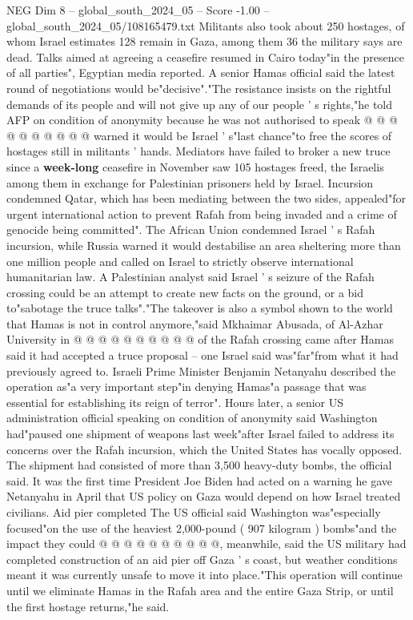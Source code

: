 \begin{textsample}{NEG Dim 8 – global\_south\_2024\_05 – Score -1.00 – global\_south\_2024\_05/108165479.txt}
Militants also took about 250 hostages, of whom Israel estimates 128 remain in Gaza, among them 36 the military says are dead.
Talks aimed at agreeing a ceasefire resumed in Cairo today"in the presence of all parties", Egyptian media reported.
A senior Hamas official said the latest round of negotiations would be"decisive"."The resistance insists on the rightful demands of its people and will not give up any of our people ' s rights,"he told AFP on condition of anonymity because he was not authorised to speak @ @ @ @ @ @ @ @ @ @ warned it would be Israel ' s"last chance"to free the scores of hostages still in militants ' hands.
Mediators have failed to broker a new truce since a \textbf{week-long} ceasefire in November saw 105 hostages freed, the Israelis among them in exchange for Palestinian prisoners held by Israel.
Incursion condemned Qatar, which has been mediating between the two sides, appealed"for urgent international action to prevent Rafah from being invaded and a crime of genocide being committed".
The African Union condemned Israel ' s Rafah incursion, while Russia warned it would destabilise an area sheltering more than one million people and called on Israel to strictly observe international humanitarian law.
A Palestinian analyst said Israel ' s seizure of the Rafah crossing could be an attempt to create new facts on the ground, or a bid to"sabotage the truce talks"."The takeover is also a symbol shown to the world that Hamas is not in control anymore,"said Mkhaimar Abusada, of Al-Azhar University in @ @ @ @ @ @ @ @ @ @ of the Rafah crossing came after Hamas said it had accepted a truce proposal -- one Israel said was"far"from what it had previously agreed to.
Israeli Prime Minister Benjamin Netanyahu described the operation as"a very important step"in denying Hamas"a passage that was essential for establishing its reign of terror".
Hours later, a senior US administration official speaking on condition of anonymity said Washington had"paused one shipment of weapons last week"after Israel failed to address its concerns over the Rafah incursion, which the United States has vocally opposed.
The shipment had consisted of more than 3,500 heavy-duty bombs, the official said.
It was the first time President Joe Biden had acted on a warning he gave Netanyahu in April that US policy on Gaza would depend on how Israel treated civilians.
Aid pier completed The US official said Washington was"especially focused"on the use of the heaviest 2,000-pound ( 907 kilogram ) bombs"and the impact they could @ @ @ @ @ @ @ @ @ @, meanwhile, said the US military had completed construction of an aid pier off Gaza ' s coast, but weather conditions meant it was currently unsafe to move it into place."This operation will continue until we eliminate Hamas in the Rafah area and the entire Gaza Strip, or until the first hostage returns,"he said.

\end{textsample}
